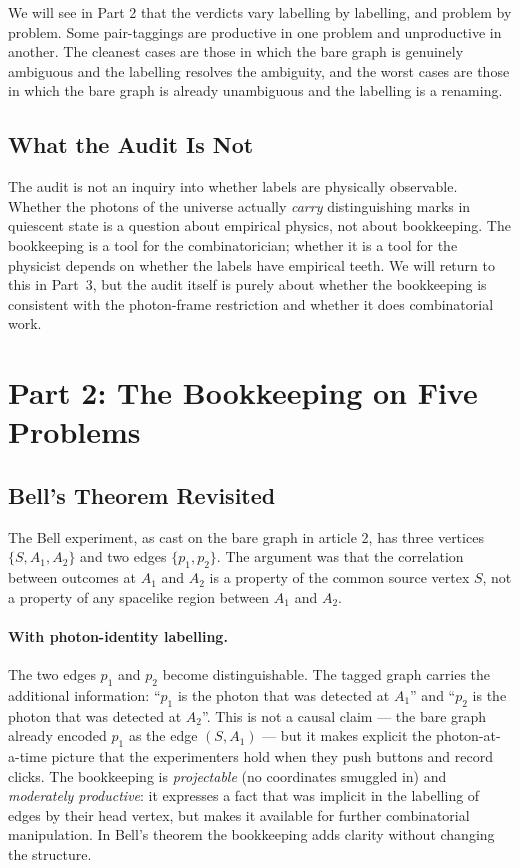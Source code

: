 \documentclass[11pt]{article}
\begin{document}
We will see in Part 2 that the verdicts vary labelling by labelling, and problem by problem. Some pair-taggings are productive in one problem and unproductive in another. The cleanest cases are those in which the bare graph is genuinely ambiguous and the labelling resolves the ambiguity, and the worst cases are those in which the bare graph is already unambiguous and the labelling is a renaming.

\subsection{What the Audit Is Not}

The audit is not an inquiry into whether labels are physically observable. Whether the photons of the universe actually \emph{carry} distinguishing marks in quiescent state is a question about empirical physics, not about bookkeeping. The bookkeeping is a tool for the combinatorician; whether it is a tool for the physicist depends on whether the labels have empirical teeth. We will return to this in Part~3, but the audit itself is purely about whether the bookkeeping is consistent with the photon-frame restriction and whether it does combinatorial work.

\section{Part 2: The Bookkeeping on Five Problems}

\label{sec:examples}

\subsection{Bell's Theorem Revisited}

The Bell experiment, as cast on the bare graph in article 2, has three vertices $\{S, A_1, A_2\}$ and two edges $\{p_1, p_2\}$. The argument was that the correlation between outcomes at $A_1$ and $A_2$ is a property of the common source vertex $S$, not a property of any spacelike region between $A_1$ and $A_2$.

\paragraph{With photon-identity labelling.} The two edges $p_1$ and $p_2$ become distinguishable. The tagged graph carries the additional information: ``$p_1$ is the photon that was detected at $A_1$'' and ``$p_2$ is the photon that was detected at $A_2$''. This is not a causal claim --- the bare graph already encoded $p_1$ as the edge $(S, A_1)$ --- but it makes explicit the photon-at-a-time picture that the experimenters hold when they push buttons and record clicks. The bookkeeping is \emph{projectable} (no coordinates smuggled in) and \emph{moderately productive}: it expresses a fact that was implicit in the labelling of edges by their head vertex, but makes it available for further combinatorial manipulation. In Bell's theorem the bookkeeping adds clarity without changing the structure.
\end{document}
